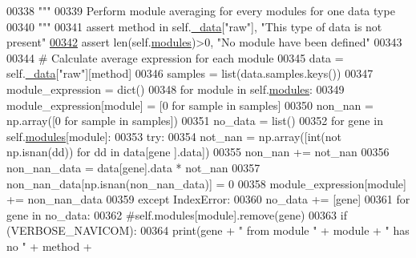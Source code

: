 \begin{DoxyCode}
00338         \textcolor{stringliteral}{"""}
00339 \textcolor{stringliteral}{        Perform module averaging for every modules for one data type}
00340 \textcolor{stringliteral}{        """}
00341         \textcolor{keyword}{assert} method \textcolor{keywordflow}{in} self.\hyperlink{classnavicom_1_1navicom_1_1NaviCom_a407b2b5c30a5652ee85c4be54b3e6679}{_data}[\textcolor{stringliteral}{"raw"}], \textcolor{stringliteral}{"This type of data is not present"}
\hypertarget{navicom_8py_source_l00342}{}\hyperlink{classnavicom_1_1navicom_1_1NaviCom_afd1a299b687bc97e171cff0a738b7b73}{00342}         \textcolor{keyword}{assert} len(self.\hyperlink{classnavicom_1_1navicom_1_1NaviCom_a56141660ddf29a36a8291e938246578c}{modules})>0, \textcolor{stringliteral}{"No module have been defined"}
00343 
00344         \textcolor{comment}{# Calculate average expression for each module}
00345         data = self.\hyperlink{classnavicom_1_1navicom_1_1NaviCom_a407b2b5c30a5652ee85c4be54b3e6679}{_data}[\textcolor{stringliteral}{"raw"}][method]
00346         samples = list(data.samples.keys())
00347         module\_expression = dict()
00348         \textcolor{keywordflow}{for} module \textcolor{keywordflow}{in} self.\hyperlink{classnavicom_1_1navicom_1_1NaviCom_a56141660ddf29a36a8291e938246578c}{modules}:
00349             module\_expression[module] = [0 \textcolor{keywordflow}{for} sample \textcolor{keywordflow}{in} samples]
00350             non\_nan = np.array([0 \textcolor{keywordflow}{for} sample \textcolor{keywordflow}{in} samples])
00351             no\_data = list()
00352             \textcolor{keywordflow}{for} gene \textcolor{keywordflow}{in} self.\hyperlink{classnavicom_1_1navicom_1_1NaviCom_a56141660ddf29a36a8291e938246578c}{modules}[module]:
00353                 \textcolor{keywordflow}{try}:
00354                     not\_nan = np.array([int(\textcolor{keywordflow}{not} np.isnan(dd)) \textcolor{keywordflow}{for} dd \textcolor{keywordflow}{in} data[gene
      ].data])
00355                     non\_nan += not\_nan
00356                     non\_nan\_data = data[gene].data * not\_nan
00357                     non\_nan\_data[np.isnan(non\_nan\_data)] = 0
00358                     module\_expression[module] += non\_nan\_data
00359                 \textcolor{keywordflow}{except} IndexError:
00360                     no\_data += [gene]
00361             \textcolor{keywordflow}{for} gene \textcolor{keywordflow}{in} no\_data:
00362                 \textcolor{comment}{#self.modules[module].remove(gene)}
00363                 \textcolor{keywordflow}{if} (VERBOSE\_NAVICOM):
00364                     \textcolor{keywordflow}{print}(gene + \textcolor{stringliteral}{" from module "} + module + \textcolor{stringliteral}{" has no "} + method +

\end{DoxyCode}

